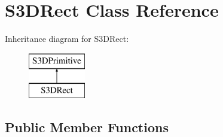 \hypertarget{class_s3_d_rect}{
\section{S3DRect Class Reference}
\label{class_s3_d_rect}
}
Inheritance diagram for S3DRect:\begin{figure}[H]
\begin{center}
\leavevmode
\includegraphics[height=2cm]{class_s3_d_rect}
\end{center}
\end{figure}
\subsection*{Public Member Functions}
